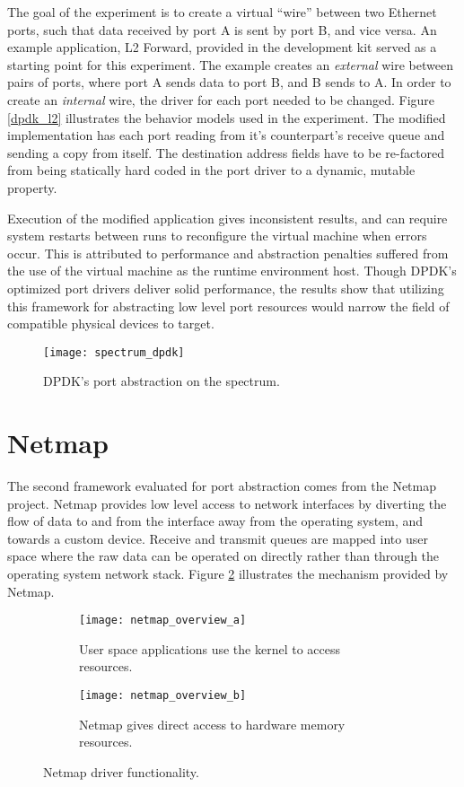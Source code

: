 The goal of the experiment is to create a virtual ``wire'' between two Ethernet
ports, such that data received by port A is sent by port B, and vice versa. An
example application, L2 Forward, provided in the development kit served as a
starting point for this experiment. The example creates an \emph{external}
wire between pairs of ports, where port A sends data to port B, and B sends to
A. In order to create an \emph{internal} wire, the driver for each port needed
to be changed. Figure \ref{dpdk_l2} illustrates the behavior models used in the
experiment. The modified implementation has each port reading from it's
counterpart's receive queue and sending a copy from itself.  The destination
address fields have to be re-factored from being statically hard coded in the
port driver to a dynamic, mutable property.

Execution of the modified application gives inconsistent results, and can
require system restarts between runs to reconfigure the virtual machine when
errors occur. This is attributed to performance and abstraction penalties
suffered from the use of the virtual machine as the runtime environment host.
Though DPDK's optimized port drivers deliver solid performance,
the results show that utilizing this framework for abstracting low level port
resources would narrow the field of compatible physical devices to target.

\begin{figure}[h!]
  \centering
  \texttt{[image: spectrum\_dpdk]}
  \caption{DPDK's port abstraction on the spectrum.}
  \label{hardware:spectrum_dpdk}
\end{figure}

\section{Netmap}
\label{hardware:netmap}
The second framework evaluated for port abstraction comes from the Netmap
project. Netmap provides low level access to network interfaces by diverting
the flow of data to and from the interface away from the operating system, and
towards a custom device. Receive and transmit queues are mapped into user space
where the raw data can be operated on directly rather than through the operating
system network stack. Figure \ref{hardware:netmap_overview} illustrates the
mechanism provided by Netmap.

\begin{figure}[h!]
  \centering
  \begin{subfigure}[b]{0.48\textwidth}
    \centering
    \texttt{[image: netmap\_overview\_a]}
    \caption{User space applications use the kernel to access resources.}
  \end{subfigure}
  \hfill
  \begin{subfigure}[b]{0.48\textwidth}
    \centering
    \texttt{[image: netmap\_overview\_b]}
    \caption{Netmap gives direct access to hardware memory resources.}
  \end{subfigure}
  \caption{Netmap driver functionality.}
  \label{hardware:netmap_overview}
\end{figure}

